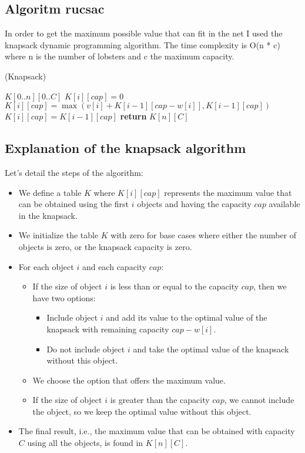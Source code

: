 \documentclass[a4paper,12pt]{article}
\begin{document}
\subsection{Algoritm rucsac}
In order to get the maximum possible value that can fit in the net I used the knapsack dynamic programming algorithm. The time complexity is O(n * c) where n is the number of lobsters and c the maximum capacity.
\begin{algorithm}
\caption{(Knapsack)}
\begin{algorithmic}[1]

\STATE {} \( K[0..n][0..C] \)
            \STATE \( K[i][cap] = 0 \)
            \STATE \( K[i][cap] = \max(v[i] + K[i-1][cap-w[i]], K[i-1][cap]) \)
        \ELSE
            \STATE \( K[i][cap] = K[i-1][cap] \)
        \ENDIF
    \ENDFOR
\ENDFOR
\STATE \textbf{return} \( K[n][C] \)
\end{algorithmic}
\end{algorithm}

\subsection{Explanation of the knapsack algorithm}

Let's detail the steps of the algorithm:

\begin{itemize}
    \item We define a table \( K \) where \( K[i][cap] \) represents the maximum value that can be obtained using the first \( i \) objects and having the capacity \( cap \) available in the knapsack.
    \item We initialize the table \( K \) with zero for base cases where either the number of objects is zero, or the knapsack capacity is zero.
    \item For each object \( i \) and each capacity \( cap \):
    \begin{itemize}
        \item If the size of object \( i \) is less than or equal to the capacity \( cap \), then we have two options:
        \begin{itemize}
            \item Include object \( i \) and add its value to the optimal value of the knapsack with remaining capacity \( cap - w[i] \).
            \item Do not include object \( i \) and take the optimal value of the knapsack without this object.
        \end{itemize}
        \item We choose the option that offers the maximum value.
        \item If the size of object \( i \) is greater than the capacity \( cap \), we cannot include the object, so we keep the optimal value without this object.
    \end{itemize}
    \item The final result, i.e., the maximum value that can be obtained with capacity \( C \) using all the objects, is found in \( K[n][C] \).
\end{itemize}
\end{document}
